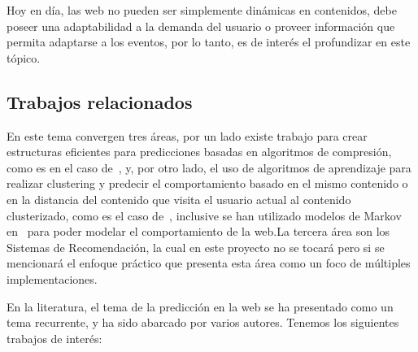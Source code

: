 \documentclass{udparticle}
\begin{document}
  Hoy en día, las web no pueden ser simplemente dinámicas en contenidos, debe poseer una adaptabilidad a la demanda del usuario o proveer información que permita adaptarse a los eventos, por lo tanto, es de interés el profundizar en este tópico.


\subsection{Trabajos relacionados}

En este tema convergen tres áreas, por un lado existe trabajo para crear estructuras eficientes para predicciones basadas en algoritmos de compresión, como es en el caso de~\cite{Claude2014}, y, por otro lado, el uso de algoritmos de aprendizaje para realizar clustering y predecir el comportamiento basado en el mismo contenido o en la distancia del contenido que visita el usuario actual al contenido clusterizado, como es el caso de~\cite{Poornalatha2012}, inclusive se han utilizado modelos de Markov en~\cite{Dongshan2002}  para poder modelar el comportamiento de la web.La tercera área son los Sistemas de Recomendación, la cual en este proyecto no se tocará pero si se mencionará el enfoque práctico que presenta  esta área como un foco de múltiples implementaciones. 


En la literatura, el tema de la predicción en la web se ha presentado como un tema recurrente, y ha sido abarcado por varios autores. Tenemos los siguientes trabajos de interés:
\end{document}
